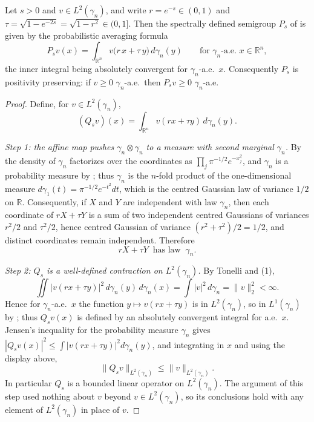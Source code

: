 \begin{lemma}
Let $s > 0$ and $v \in L^2(\gamma_n)$, and write $r = e^{-s} \in (0,1)$ and
$\tau = \sqrt{1-e^{-2s}} = \sqrt{1-r^2} \in (0,1]$.  Then the spectrally defined
semigroup $P_s$ of  is given by the probabilistic averaging
formula
\[
  P_s v(x)
    = \int_{\mathbb{R}^n} v\bigl(r\,x + \tau\,y\bigr)\, d\gamma_n(y)
  \qquad\text{for } \gamma_n\text{-a.e. } x \in \mathbb{R}^n ,
\]
the inner integral being absolutely convergent for $\gamma_n$-a.e.\ $x$.
Consequently $P_s$ is positivity preserving: if $v \geq 0$ $\gamma_n$-a.e.\ then
$P_s v \geq 0$ $\gamma_n$-a.e.
\end{lemma}
\begin{proof}
Define, for $v \in L^2(\gamma_n)$,
\[
  (Q_s v)(x) = \int_{\mathbb{R}^n} v(r x + \tau y)\, d\gamma_n(y) .
\]

\emph{Step 1: the affine map pushes $\gamma_n\otimes\gamma_n$ to a measure with second marginal $\gamma_n$.}
By  the density of $\gamma_n$ factorizes over the
coordinates as $\prod_j \pi^{-1/2}e^{-x_j^2}$, and $\gamma_n$ is a probability
measure by ; thus $\gamma_n$ is the $n$-fold product of the
one-dimensional measure $d\gamma_1(t) = \pi^{-1/2}e^{-t^2}dt$, which is the
centred Gaussian law of variance $1/2$ on $\mathbb{R}$.  Consequently, if $X$ and
$Y$ are independent with law $\gamma_n$, then each coordinate of
$rX + \tau Y$ is a sum of two independent centred Gaussians of variances
$r^2/2$ and $\tau^2/2$, hence centred Gaussian of variance
$(r^2+\tau^2)/2 = 1/2$, and distinct coordinates remain independent.  Therefore
\begin{equation*}
  rX + \tau Y \ \text{ has law } \ \gamma_n . \tag{1}
\end{equation*}

\emph{Step 2: $Q_s$ is a well-defined contraction on $L^2(\gamma_n)$.}
By Tonelli and (1),
\[
  \iint |v(rx+\tau y)|^2\, d\gamma_n(y)\, d\gamma_n(x)
    = \int |v|^2\, d\gamma_n = \|v\|_2^2 < \infty .
\]
Hence for $\gamma_n$-a.e.\ $x$ the function $y \mapsto v(rx+\tau y)$ is in
$L^2(\gamma_n)$, so in $L^1(\gamma_n)$ by ; thus $Q_sv(x)$ is
defined by an absolutely convergent integral for a.e.\ $x$.  Jensen's inequality
for the probability measure $\gamma_n$ gives
$|Q_sv(x)|^2 \leq \int |v(rx+\tau y)|^2 d\gamma_n(y)$, and integrating in $x$ and
using the display above,
\begin{equation*}
  \|Q_s v\|_{L^2(\gamma_n)} \leq \|v\|_{L^2(\gamma_n)} . \tag{2}
\end{equation*}
In particular $Q_s$ is a bounded linear operator on $L^2(\gamma_n)$.  The
argument of this step used nothing about $v$ beyond $v \in L^2(\gamma_n)$, so
its conclusions hold with any element of $L^2(\gamma_n)$ in place of $v$.


\end{proof}

